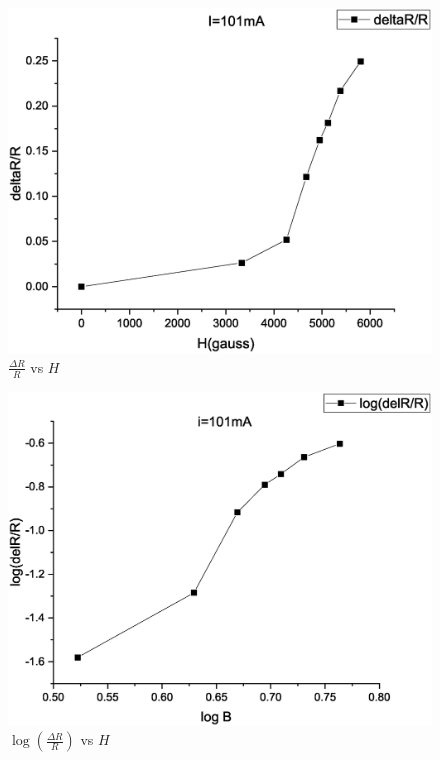 
\begin{figure}[]
    \centering
    \includegraphics[width=0.95\columnwidth]{images/Graph3.eps}
    \caption{$\frac{\Delta R}{R}$ vs $H$}
    \label{fig:graph3}
\end{figure}

\begin{figure}[]
    \centering
    \includegraphics[width=0.95\columnwidth]{images/Graph4.eps}
    \caption{$\log(\frac{\Delta R}{R})$ vs $H$}
    \label{fig:graph4}
\end{figure}






